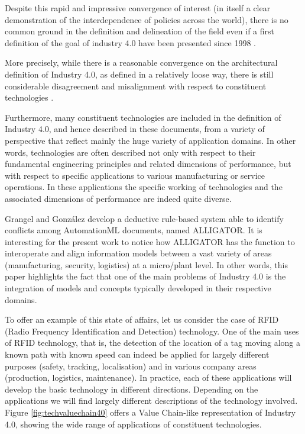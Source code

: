 \documentclass[]{book}
\begin{document}
Despite this rapid and impressive convergence of interest (in itself a
clear demonstration of the interdependence of policies across the
world), there is no common ground in the definition and delineation of
the field even if a first definition of the goal of industry 4.0 have
been presented since 1998 \citep{national1998visionary}.

More precisely, while there is a reasonable convergence on the
architectural definition of Industry 4.0, as defined in a relatively
loose way, there is still considerable disagreement and misalignment
with respect to constituent technologies
\citep{riel2017integrated, smit2016industry, o2015industrial}.

Furthermore, many constituent technologies are included in the
definition of Industry 4.0, and hence described in these documents, from
a variety of perspective that reflect mainly the huge variety of
application domains. In other words, technologies are often described
not only with respect to their fundamental engineering principles and
related dimensions of performance, but with respect to specific
applications to various manufacturing or service operations. In these
applications the specific working of technologies and the associated
dimensions of performance are indeed quite diverse.

Grangel and González \citep{grangel2016towards} develop a deductive
rule-based system able to identify conflicts among AutomationML
documents, named ALLIGATOR. It is interesting for the present work to
notice how ALLIGATOR has the function to interoperate and align
information models between a vast variety of areas (manufacturing,
security, logistics) at a micro/plant level. In other words, this paper
highlights the fact that one of the main problems of Industry 4.0 is the
integration of models and concepts typically developed in their
respective domains.

To offer an example of this state of affairs, let us consider the case
of RFID (Radio Frequency Identification and Detection) technology. One
of the main uses of RFID technology, that is, the detection of the
location of a tag moving along a known path with known speed can indeed
be applied for largely different purposes (safety, tracking,
localisation) and in various company areas (production, logistics,
maintenance). In practice, each of these applications will develop the
basic technology in different directions. Depending on the applications
we will find largely different descriptions of the technology involved.
Figure \ref{fig:techvaluechain40} offers a Value Chain-like
representation of Industry 4.0, showing the wide range of applications
of constituent technologies.
\end{document}
